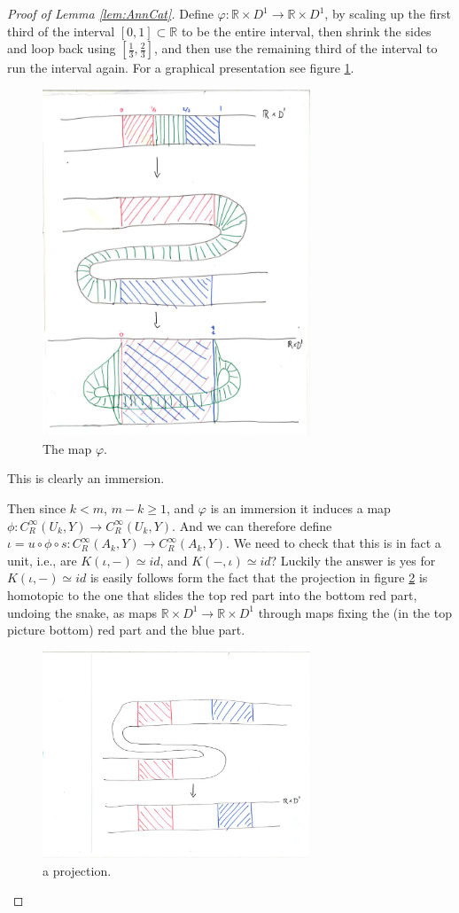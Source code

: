 \documentclass{article}
\newtheorem{proposed work}[theorem]{Proposed Work}
\theoremstyle{definition}
\begin{document}
\begin{proof}[Proof of Lemma \ref{lem:AnnCat}]
Define $\varphi: \mathbb{R}\times D^1 \to \mathbb{R}\times D^1$, by scaling up the first third of the interval $[0,1]\subset \mathbb{R}$ to be the entire interval, then shrink the sides and loop back using $[\frac{1}{3},\frac{2}{3}]$, and then use the remaining third of the interval to run the interval again. For a graphical presentation see figure \ref{themapphi}.
\begin{figure}[h] 
\includegraphics[width=8cm]{TheMapphi.pdf}
\caption{ \label{themapphi} The map $\varphi$.}
\end{figure}
 This is clearly an immersion. 

Then since $k<m$, $m-k\geq 1$, and $\varphi$ is an immersion it induces a map $\phi: C^\infty_R(U_k,Y)\to C^\infty_R(U_k,Y)$. And we can therefore define $\iota=u\circ \phi \circ s: C^\infty_R(A_k,Y)\to C^\infty_R(A_k,Y)$. We need to check that this is in fact a unit, i.e., are $K(\iota,-)\simeq id$, and $K(-,\iota)\simeq id$? Luckily the answer is yes for $K(\iota,-)\simeq id$ is easily follows form the fact that the projection in figure \ref{snakeundo} is homotopic to the one that slides the top red part into the bottom red part, undoing the snake, as maps $\mathbb{R}\times D^1\to \mathbb{R}\times D^1$ through maps fixing the (in the top picture bottom) red part and the blue part.
\begin{figure}[h] 
\includegraphics[width=8cm]{Snakeundo.pdf}
\caption{ \label{snakeundo} a projection.}
\end{figure}

\end{proof}
\end{document}
